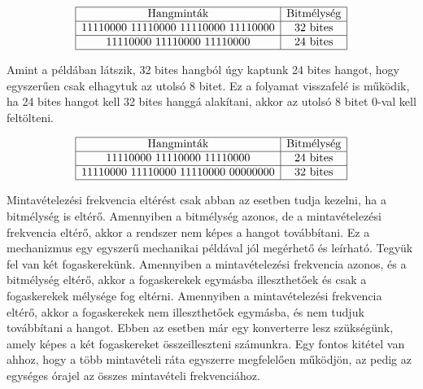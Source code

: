 \begin{align*}
	\begin{array}{|c|c|}
	\hline
	\text{Hangminták} & \text{Bitmélység} \\
	\hline
	\text{11110000 11110000 11110000 11110000} & \text{32 bites} \\
	\hline
	\text{11110000 11110000 11110000} & \text{24 bites} \\
	\hline
	\end{array}
\end{align*}
	
Amint a példában látszik, 32 bites hangból úgy kaptunk 24 bites hangot, 
hogy egyszerűen csak elhagytuk az utolsó 8 bitet. Ez a folyamat visszafelé is működik,
ha 24 bites hangot kell 32 bites hanggá alakítani, akkor az utolsó 8 bitet 0-val kell feltölteni.

\begin{align*}
	\begin{array}{|c|c|}
	\hline
	\text{Hangminták} & \text{Bitmélység} \\
	\hline
	\text{11110000 11110000 11110000} & \text{24 bites} \\
	\hline
	\text{11110000 11110000 11110000 00000000} & \text{32 bites} \\
	\hline
	\end{array}
\end{align*}

Mintavételezési frekvencia eltérést csak abban az esetben tudja kezelni, ha a
bitmélység is eltérő. Amennyiben a bitmélység azonos, de a mintavételezési
frekvencia eltérő, akkor a rendszer nem képes a hangot továbbítani.
Ez a mechanizmus egy egyszerű mechanikai példával jól megérhető és leírható.
Tegyük fel van két fogaskerekünk. Amennyiben a mintavételezési frekvencia azonos, és a 
bitmélység eltérő, akkor a fogaskerekek egymásba illeszthetőek és csak a fogaskerekek
mélysége fog eltérni. Amennyiben a mintavételezési frekvencia eltérő, akkor a fogaskerekek
nem illeszthetőek egymásba, és nem tudjuk továbbítani a hangot. Ebben az esetben már egy
konverterre lesz szükségünk, amely képes a két fogaskereket összeilleszteni számunkra.
Egy fontos kitétel van ahhoz, hogy a több mintavételi ráta egyszerre megfelelően működjön,
az pedig az egységes órajel az összes mintavételi frekvenciához.


